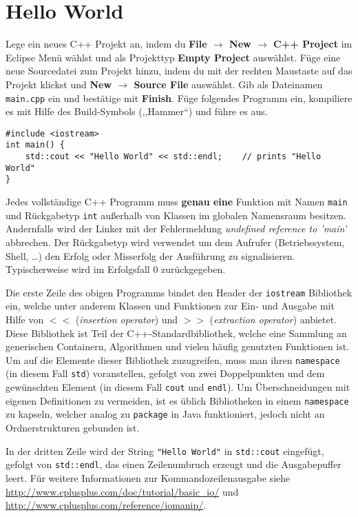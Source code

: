 \section{Hello World}
Lege ein neues C++ Projekt an, indem du \textbf{File $\rightarrow$ New $\rightarrow$ C++ Project} im Eclipse Menü wählst und als Projekttyp \textbf{Empty Project} auswählst.
Füge eine neue Sourcedatei zum Projekt hinzu, indem du mit der rechten Maustaste auf das Projekt klickst und \textbf{New $\rightarrow$ Source File} auswählst.
Gib als Dateinamen \texttt{main.cpp} ein und bestätige mit \textbf{Finish}.
Füge folgendes Programm ein, kompiliere es mit Hilfe des Build-Symbols (,,Hammer``) und führe es aus.

\begin{lstlisting}
#include <iostream>
int main() {
	std::cout << "Hello World" << std::endl;	// prints "Hello World"
}
\end{lstlisting}

Jedes vollständige C++ Programm muss \textbf{genau eine} Funktion mit Namen \texttt{main} und Rückgabetyp \texttt{int} außerhalb von Klassen im globalen Namensraum besitzen. Andernfalls wird der Linker mit der Fehlermeldung \emph{undefined reference to 'main'} abbrechen.
Der Rückgabetyp wird verwendet um dem Aufrufer (Betriebssystem, Shell, \dots) den Erfolg oder Misserfolg der Ausführung zu signalisieren.
Typischerweise wird im Erfolgsfall 0 zurückgegeben.

Die erste Zeile des obigen Programms bindet den Header der \texttt{iostream} Bibliothek ein, welche unter anderem Klassen und Funktionen zur Ein- und Ausgabe mit Hilfe von $<<$ (\emph{insertion operator}) und $>>$ (\emph{extraction operator}) anbietet.
Diese Bibliothek ist Teil der C++-Standardbibliothek, welche eine Sammlung an generischen Containern, Algorithmen und vielen häufig genutzten Funktionen ist.
Um auf die Elemente dieser Bibliothek zuzugreifen, muss man ihren \texttt{namespace} (in diesem Fall \texttt{std}) voranstellen, gefolgt von zwei Doppelpunkten und dem gewünschten Element (in diesem Fall \texttt{cout} und \texttt{endl}).
Um Überschneidungen mit eigenen Definitionen zu vermeiden, ist es üblich Bibliotheken in einem \texttt{namespace} zu kapseln, welcher analog zu \texttt{package} in Java funktioniert, jedoch nicht an Ordnerstrukturen gebunden ist.

In der dritten Zeile wird der String \texttt{"Hello World"} in \texttt{std::cout} eingefügt, gefolgt von \texttt{std::endl}, das einen Zeilenumbruch erzeugt und die Ausgabepuffer leert. Für weitere Informationen zur Kommandozeilenausgabe siehe \url{http://www.cplusplus.com/doc/tutorial/basic_io/} und \url{http://www.cplusplus.com/reference/iomanip/}.

